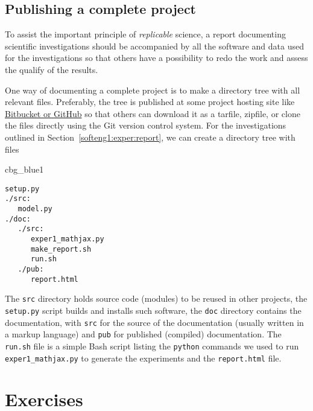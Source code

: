 \documentclass[graybox,sectrefs,envcountresetchap,open=right,final]{svmonodo}
\newenvironment{_cod_tight}[1]{
   \def\FrameCommand{\colorbox{#1}}
   \FrameRule0.6pt\MakeFramed {\FrameRestore}\vskip3mm}
   {\vskip0mm\endMakeFramed}
\newenvironment{cod}[1]{
\bgroup\rmfamily
\fboxsep=0mm\relax
\begin{_cod_tight}{#1}
\list{}{\parsep=-2mm\parskip=0mm\topsep=0pt\leftmargin=2mm
\rightmargin=2\leftmargin\leftmargin=4pt\relax}
\item\relax}
{\endlist\end{_cod_tight}\egroup}
\begin{document}

\subsection{Publishing a complete project}
\label{softeng1:exper:github}


To assist the important principle of \emph{replicable} science,
a report documenting scientific investigations should be accompanied by
all the software and data used for the investigations so that others
have a possibility to redo the work and assess the qualify of the results.

One way of documenting a complete project is to make a directory tree
with all relevant files. Preferably, the tree is published at
some project hosting site like \href{{http://hplgit.github.com/teamods/bitgit/html/}}{Bitbucket or GitHub} so that others can download it
as a tarfile, zipfile, or clone the files directly using the Git version control
system.
For the investigations outlined in Section~\ref{softeng1:exper:report},
we can create a directory tree with files
\begin{cod}{cbg_blue1}\begin{Verbatim}[numbers=none,fontsize=\fontsize{9pt}{9pt},baselinestretch=0.95,xleftmargin=2mm]
setup.py
./src:
   model.py
./doc:
   ./src:
      exper1_mathjax.py
      make_report.sh
      run.sh
   ./pub:
      report.html
\end{Verbatim}
\end{cod}
\noindent
The \texttt{src} directory holds source code (modules) to be reused in other projects,
the \texttt{setup.py} script builds and installs such software,
the \texttt{doc} directory contains the documentation, with \texttt{src} for the
source of the documentation (usually written in a markup language)
and \texttt{pub} for published (compiled) documentation.
The \texttt{run.sh} file is a simple Bash script listing the \texttt{python} commands
we used to run \Verb!exper1_mathjax.py! to generate the experiments and
the \texttt{report.html} file.



\section{Exercises}
\end{document}
